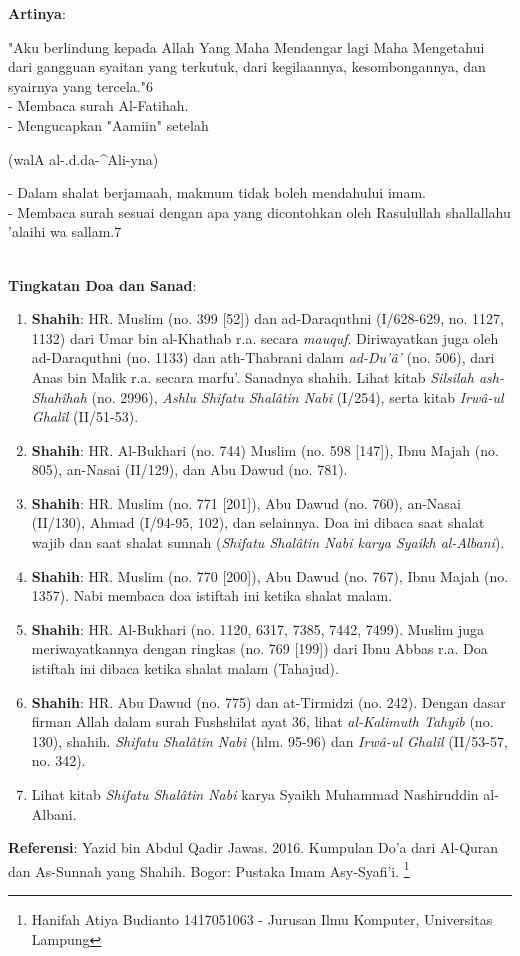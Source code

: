 \documentclass[a4paper,12pt]{article}
\begin{document}
\noindent
\textbf{Artinya}:
\par
\indent
"Aku berlindung kepada Allah Yang Maha Mendengar lagi Maha Mengetahui dari 
gangguan syaitan yang terkutuk, dari kegilaannya, kesombongannya, dan 
syairnya yang tercela."{\scriptsize 6}\\
- Membaca surah Al-Fatihah.\\
- Mengucapkan "Aamiin" setelah \begin{arabtext} (walA al-.d.da-^Ali-yna)
\end{arabtext}
- Dalam shalat berjamaah, makmum tidak boleh mendahului imam.\\
- Membaca surah sesuai dengan apa yang dicontohkan oleh Rasulullah
shallallahu 'alaihi wa sallam.{\scriptsize 7}\\\\
\par
\noindent
\textbf{Tingkatan Doa dan Sanad}:
\begin{enumerate}
\item \textbf{Shahih}: HR. Muslim (no. 399 [52]) dan ad-Daraquthni 
(I/628-629, no. 1127, 1132) dari Umar bin al-Khathab r.a. secara 
\textit{mauquf}. Diriwayatkan juga oleh ad-Daraquthni (no. 1133) dan 
ath-Thabrani dalam \textit{ad-Du'\^{a}'} (no. 506), dari Anas bin Malik 
r.a. secara marfu'. Sanadnya shahih. Lihat kitab \textit{Silsilah 
ash-Shah\^{i}hah} (no. 2996), \textit{Ashlu Shifatu Shal\^{a}tin Nabi} 
(I/254), serta kitab \textit{Irw\^{a}-ul Ghal\^{i}l} (II/51-53).
\item \textbf{Shahih}: HR. Al-Bukhari (no. 744) Muslim (no. 598 [147]), 
Ibnu Majah (no. 805), an-Nasai (II/129), dan Abu Dawud (no. 781).
\item \textbf{Shahih}: HR. Muslim (no. 771 [201]), Abu Dawud (no. 760), 
an-Nasai (II/130), Ahmad (I/94-95, 102), dan selainnya. Doa ini dibaca saat
shalat wajib dan saat shalat sunnah (\textit{Shifatu Shal\^{a}tin Nabi 
karya Syaikh al-Albani}).                                                  
\item \textbf{Shahih}: HR. Muslim (no. 770 [200]), Abu Dawud (no. 767), 
Ibnu Majah (no. 1357). Nabi membaca doa istiftah ini ketika shalat malam.
\item \textbf{Shahih}: HR. Al-Bukhari (no. 1120, 6317, 7385, 7442, 7499). 
Muslim juga meriwayatkannya dengan ringkas (no. 769 [199]) dari Ibnu Abbas 
r.a. Doa istiftah ini dibaca ketika shalat malam (Tahajud).
\item \textbf{Shahih}: HR. Abu Dawud (no. 775) dan at-Tirmidzi (no. 242). 
Dengan dasar firman Allah dalam surah Fushshilat ayat 36, lihat 
\textit{al-Kalimuth Tahyib} (no. 130), shahih. \textit{Shifatu Shal\^{a}tin
Nabi} (hlm. 95-96) dan \textit{Irw\^{a}-ul Ghal\^{i}l} (II/53-57, no. 342).
\item Lihat kitab \textit{Shifatu Shal\^{a}tin Nabi} karya Syaikh Muhammad 
Nashiruddin al-Albani.
\end{enumerate}
\textbf{Referensi}: Yazid bin Abdul Qadir Jawas. 2016. Kumpulan Do'a dari
Al-Quran dan As-Sunnah yang Shahih. Bogor: Pustaka Imam Asy-Syafi'i.
\footnote{Hanifah Atiya Budianto 1417051063 - Jurusan Ilmu Komputer,
Universitas Lampung}
\end{document}
